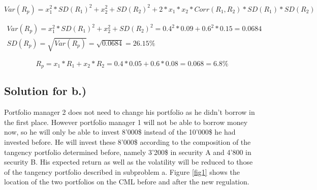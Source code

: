 \documentclass[a4paper,11pt,twoside]{article}
\begin{document}
\begin{equation}
\label{eq3}
Var(R_p) = x_1^2*SD(R_1)^2+x_2^2+SD(R_2)^2 + 2*x_1*x_2*Corr(R_1,R_2)*SD(R_1)*SD(R_2) 
\end{equation}

\begin{equation}
\begin{split}
\label{eq4}
Var(R_p) = x_1^2*SD(R_1)^2+x_2^2+SD(R_2)^2 = 0.4^2*0.09 + 0.6^2*0.15 = 0.0684 \\
SD(R_p) = \sqrt{Var(R_p)} = \sqrt{0.0684} = 26.15\%
\end{split}
\end{equation}

\begin{equation}
\label{eq5}
R_p = x_1*R_1+x_2*R_2 = 0.4*0.05+0.6*0.08 = 0.068 = 6.8\%
\end{equation}

\subsection{Solution for b.)}

Portfolio manager 2 does not need to change his portfolio as he didn't borrow in the first place. However portfolio manager 1 will not be able to borrow money now, so he will only be able to invest 8'000\$ instead of the 10'000\$ he had invested before. He will invest these 8'000\$ according to the composition of the tangency portfolio determined before, namely 3'200\$ in security A and 4'800 in security B. His expected return as well as the volatility will be reduced to those of the tangency portfolio described in subproblem a. Figure \ref{fig1} shows the location of the two portfolios on the CML before and after the new regulation.
\end{document}
